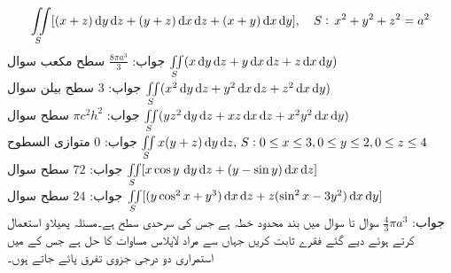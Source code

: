 \begin{align*}\iint\limits_S [(x+z)\dif y \dif z+(y+z)\dif x\dif z+(x+y)\dif x\dif y],\quad S:\, x^2+y^2+z^2=a^2\end{align*}
جواب:\quad
$\tfrac{8\pi a^3}{3}$
\quad سطح مکعب سوال \quad 
$\iint\limits_S (x\dif y \dif z+y\dif x\dif z+z\dif x\dif y)$\\
جواب:\quad
$3$
\quad سطح بیلن سوال \quad 
$\iint\limits_S (x^2\dif y \dif z+y^2\dif x\dif z+z^2\dif x\dif y)$\\
جواب:\quad
$\pi c^2h^2$
\quad سطح سوال \quad
$\iint\limits_S (yz^2\dif y \dif z+xz\dif x\dif z+x^2y^2\dif x\dif y)$\\
جواب:\quad
$0$
\quad متوازی السطوح
$\iint\limits_S x(y+z)\dif y \dif z,\, S:0\le x \le 3, 0\le y \le 2,0\le z \le 4\,\,$\\
جواب:\quad
$72$
\quad سطح سوال 
$\iint\limits_S [x\cos y\,\dif y \dif z+(y-\sin y)\dif x\dif z]\,\,$\\
جواب:\quad
$24$
\quad سطح سوال 
$\iint\limits_S [(y\cos^2 x+y^3)\dif x\dif z+z(\sin^2 x-3y^2)\dif x\dif y]$\\
جواب:\quad
$\tfrac{4}{3}\pi a^3$
سوال  تا سوال  میں  بند محدود خطہ ہے جس کی سرحدی سطح  ہے۔مسئلہ پھیلاو استعمال کرتے ہوئے دیے  گئے فقرے ثابت کریں جہاں  سے مراد لاپلاس مساوات کا حل ہے جس کے  میں استمراری دو درجی جزوی تفرق پائے جاتے ہوں۔

